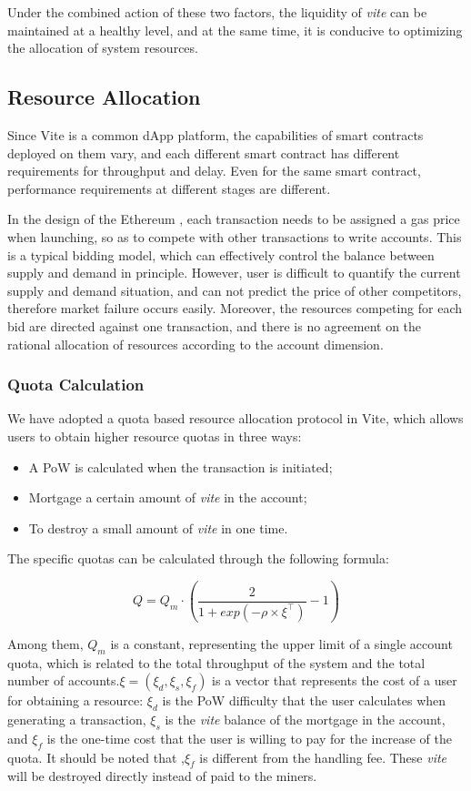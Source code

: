 \documentclass[UTF8,nofonts]{article}
\begin{document}
\begin{multicols}{2}
Under the combined action of these two factors, the liquidity of \textit{vite} can be maintained at a healthy level, and at the same time, it is conducive to optimizing the allocation of system resources.

\subsection{Resource Allocation}
Since Vite is a common dApp platform, the capabilities of smart contracts deployed on them vary, and each different smart contract has different requirements for throughput and delay. Even for the same smart contract, performance requirements at different stages are different.

In the design of the Ethereum , each transaction needs to be assigned a gas price when launching, so as to compete with other transactions to write accounts. This is a typical bidding model, which can effectively control the balance between supply and demand in principle. However, user is difficult to quantify the current supply and demand situation, and can not predict the price of other competitors, therefore market failure occurs easily. Moreover, the resources competing for each bid are directed against one transaction, and there is no agreement on the rational allocation of resources according to the account dimension.

\subsubsection{Quota Calculation}
We have adopted a quota based resource allocation protocol in Vite, which allows users to obtain higher resource quotas in three ways:
\begin{itemize}
\item A PoW is calculated when the transaction is initiated;
\item Mortgage a certain amount of \textit{vite} in the account;
\item To destroy a small amount of \textit{vite} in one time.
\end{itemize}

The specific quotas can be calculated through the following formula:

\begin{equation}
Q = Q_{m} \cdot \left ( \frac{2}{1+exp\left ( -\rho \times \xi^{\top} \right )} - 1  \right )
\end{equation}

Among them, $Q_{m}$ is a constant, representing the upper limit of a single account quota, which is related to the total throughput of the system and the total number of accounts.$\xi=(\xi_{d}, \xi_{s}, \xi_{f})$ is a vector that represents the cost of a user for obtaining a resource: $\xi_{d}$ is the PoW difficulty that the user calculates when generating a transaction, $\xi_{s}$ is the \textit{vite} balance of the mortgage in the account, and $\xi_{f}$ is the one-time cost that the user is willing to pay for the increase of the quota. It should be noted that ,$\xi_{f}$ is different from the handling fee. These \textit{vite} will be destroyed directly instead of paid to the miners.


\end{multicols}
\end{document}

